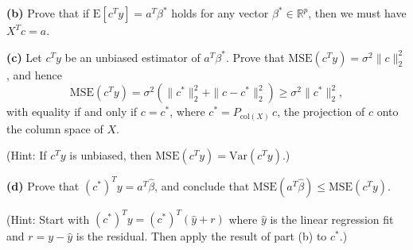 \documentclass[11pt]{article}
\def\E{\mathrm{E}}
\def\Var{\mathrm{Var}}
\newcommand{\R}{\mathbb{R}}
\def\hbeta{\hat{\beta}}
\begin{document}
\bigskip
\noindent
{\bf (b)} Prove that if $\E[c^T y] = a^T \beta^*$ holds for any vector $\beta^* \in \R^p$,
then we must have $X^Tc = a$. 

\bigskip
\noindent
{\bf (c)} Let $c^T y$ be an unbiased estimator of $a^T\beta^*$. Prove that 
$\mathrm{MSE}(c^T y) = \sigma^2 \|c\|_2^2$, and hence
\begin{equation*}
\mathrm{MSE}(c^T y) = \sigma^2 ( \|c^*\|_2^2 + \|c-c^*\|_2^2 )
\geq \sigma^2 \|c^*\|_2^2,
\end{equation*}
with equality if and only if $c=c^*$, where $c^* = P_{\mathrm{col}(X)} \, c$, the
projection of $c$ onto the column space of $X$.

\smallskip
\smallskip
\noindent
(Hint: If $c^T y$ is unbiased, then $\mathrm{MSE}(c^T y) = \Var(c^T y)$.) 

\bigskip
\noindent
{\bf (d)} Prove that $(c^*)^T y = a^T \hbeta$, and conclude that 
$\mathrm{MSE}(a^T \hbeta) \leq \mathrm{MSE}(c^T y)$. 

\smallskip
\smallskip
\noindent
(Hint: Start with $(c^*)^T y = (c^*)^T (\hat{y} + r)$ where $\hat{y}$ is the 
linear regression fit and $r=y-\hat{y}$ is the residual. Then apply the result of 
part (b) to $c^*$.)
\end{document}
